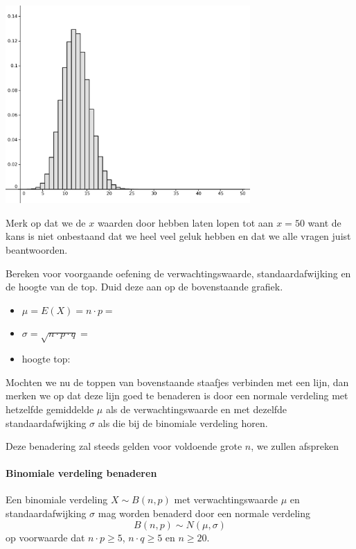 \documentclass[a4paper,12pt, twoside]{article}
\begin{document}
\begin{center}
\includegraphics[width=0.7\textwidth]{binomial_punten}
\end{center}

Merk op dat we de $x$ waarden door hebben laten lopen tot aan $x=50$ want de kans is niet onbestaand dat we heel veel geluk hebben en dat we alle vragen juist beantwoorden.

\begin{oefening}
Bereken voor voorgaande oefening de verwachtingswaarde, standaardafwijking en de hoogte van de top. Duid deze aan op de bovenstaande grafiek.
\begin{itemize}
  \item $\mu=E(X)=n\cdot p=$ \arulefill
  \item $\sigma=\sqrt{n\cdot p\cdot q}=$ \arulefill
  \item hoogte top: \arulefill
\end{itemize}
\end{oefening}

Mochten we nu de toppen van bovenstaande staafjes verbinden met een lijn, dan merken we op dat deze lijn goed te benaderen is door een normale verdeling met hetzelfde gemiddelde $\mu$ als de verwachtingswaarde en met dezelfde standaardafwijking $\sigma$ als die bij de binomiale verdeling horen.

Deze benadering zal steeds gelden voor voldoende grote $n$, we zullen afspreken

\paragraph*{Binomiale verdeling benaderen}
\begin{mdframed}
Een binomiale verdeling $X\sim B(n,p)$ met verwachtingswaarde $\mu$ en standaardafwijking $\sigma$ mag worden benaderd door een normale verdeling
$$B(n,p)\sim N(\mu,\sigma)$$
op voorwaarde dat $n\cdot p\geq5$, $n\cdot q\geq5$ en $n\geq 20$.
\end{mdframed}
\end{document}

